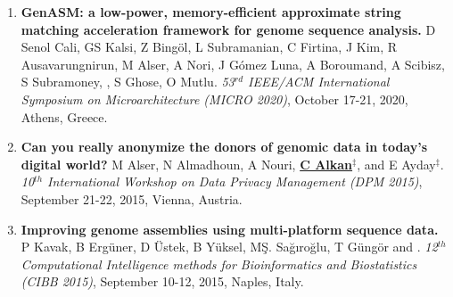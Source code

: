 \begin{enumerate}
\item
{\bf GenASM: a low-power, memory-efficient approximate string matching acceleration framework for genome sequence analysis.}
D Senol Cali, GS Kalsi, Z Bingöl, L Subramanian, C Firtina, J Kim, R Ausavarungnirun, M Alser,
A Nori, J Gómez Luna, A Boroumand, A Scibisz, S Subramoney, \calkan{}, S Ghose, O Mutlu.
{\em 53$^{rd}$ IEEE/ACM International Symposium on Microarchitecture (MICRO 2020)}, October 17-21, 2020, Athens, Greece.

    \item 

{\bf Can you really anonymize the donors of genomic data in today's digital world?}
M Alser, N Almadhoun, A Nouri, {\bf {\underline{C Alkan}}}$^\ddag$, and E Ayday$^\ddag$. 
{\em 10$^{th}$ International Workshop on Data Privacy Management (DPM 2015)}, 
 September 21-22, 2015, Vienna, Austria.


\item

{\bf Improving genome assemblies using multi-platform sequence data.}
P Kavak, B Ergüner, D Üstek, B Yüksel, MŞ. Sağıroğlu, T Güngör and \calkan{}.
{\em 12$^{th}$ Computational Intelligence methods for Bioinformatics and Biostatistics (CIBB 2015)}, 
 September 10-12, 2015, Naples, Italy.







\end{enumerate}

